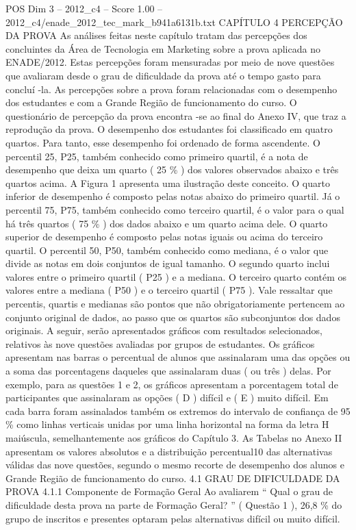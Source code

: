 \begin{textsample}{POS Dim 3 – 2012\_c4 – Score 1.00 – 2012\_c4/enade\_2012\_tec\_mark\_b941a6131b.txt}  \label{ex:f3_pos_159}
CAPÍTULO 4 PERCEPÇÃO DA PROVA As análises feitas neste capítulo tratam das percepções dos concluintes da Área de Tecnologia em Marketing sobre a prova aplicada no ENADE/2012.
Estas percepções foram mensuradas por meio de nove questões que avaliaram desde o grau de dificuldade da prova até o tempo gasto para concluí -la.
As percepções sobre a prova foram relacionadas com o desempenho dos estudantes e com a Grande Região de funcionamento do curso.
O questionário de percepção da prova encontra -se ao final do Anexo IV, que traz a reprodução da prova.
O desempenho dos estudantes foi classificado em quatro quartos.
Para tanto, esse desempenho foi ordenado de forma ascendente.
O percentil 25, P25, também conhecido como primeiro quartil, é a nota de desempenho que deixa um quarto ( 25 \% ) dos valores observados abaixo e três quartos acima.
A Figura 1 apresenta uma ilustração deste conceito.
O quarto inferior de desempenho é composto pelas notas abaixo do primeiro quartil.
Já o percentil 75, P75, também conhecido como terceiro quartil, é o valor para o qual há três quartos ( 75 \% ) dos dados abaixo e um quarto acima dele.
O quarto superior de desempenho é composto pelas notas iguais ou acima do terceiro quartil.
O percentil 50, P50, também conhecido como mediana, é o valor que divide as notas em dois conjuntos de igual tamanho.
O segundo quarto inclui valores entre o primeiro quartil ( P25 ) e a mediana.
O terceiro quarto contém os valores entre a mediana ( P50 ) e o terceiro quartil ( P75 ).
Vale ressaltar que percentis, quartis e medianas são pontos que não obrigatoriamente pertencem ao conjunto original de dados, ao passo que os quartos são subconjuntos dos dados originais.
A seguir, serão apresentados gráficos com resultados selecionados, relativos às nove questões avaliadas por grupos de estudantes.
Os gráficos apresentam nas barras o percentual de alunos que assinalaram uma das opções ou a soma das porcentagens daqueles que assinalaram duas ( ou três ) delas.
Por exemplo, para as questões 1 e 2, os gráficos apresentam a porcentagem total de participantes que assinalaram as opções ( D ) difícil e ( E ) muito difícil.
Em cada barra foram assinalados também os extremos do intervalo de confiança de 95 \% como linhas verticais unidas por uma linha horizontal na forma da letra H maiúscula, semelhantemente aos gráficos do Capítulo 3.
As Tabelas no Anexo II apresentam os valores absolutos e a distribuição percentual10 das alternativas válidas das nove questões, segundo o mesmo recorte de desempenho dos alunos e Grande Região de funcionamento do curso. 4.1 GRAU DE DIFICULDADE DA PROVA 4.1.1 Componente de Formação Geral Ao avaliarem “ Qual o grau de dificuldade desta prova na parte de Formação Geral? ” ( Questão 1 ), 26,8 \% do grupo de inscritos e presentes optaram pelas alternativas difícil ou muito difícil.

\end{textsample}
